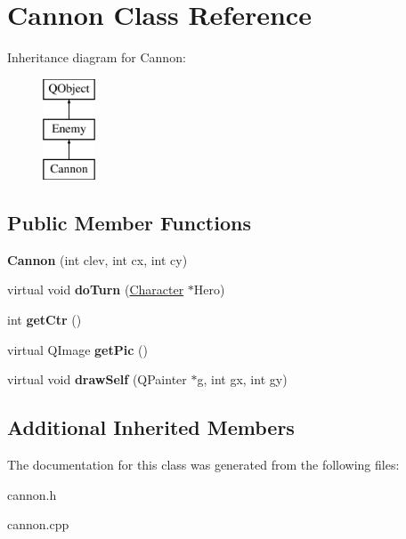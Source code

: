 \hypertarget{class_cannon}{\section{Cannon Class Reference}
\label{class_cannon}
}
Inheritance diagram for Cannon\-:\begin{figure}[H]
\begin{center}
\leavevmode
\includegraphics[height=3.000000cm]{class_cannon}
\end{center}
\end{figure}
\subsection*{Public Member Functions}
\begin{DoxyCompactItemize}
\item 
\hypertarget{class_cannon_a167a36b440912282d8c0b44c93afd20d}{{\bfseries Cannon} (int clev, int cx, int cy)}\label{class_cannon_a167a36b440912282d8c0b44c93afd20d}

\item 
\hypertarget{class_cannon_a0ac51832424376a120add27a8b8f2759}{virtual void {\bfseries do\-Turn} (\hyperlink{class_character}{Character} $\ast$Hero)}\label{class_cannon_a0ac51832424376a120add27a8b8f2759}

\item 
\hypertarget{class_cannon_a38f8c0c7f785ee10df1d83c8274ce546}{int {\bfseries get\-Ctr} ()}\label{class_cannon_a38f8c0c7f785ee10df1d83c8274ce546}

\item 
\hypertarget{class_cannon_acd2aee39d3e6b40681c69d44626ce6dd}{virtual Q\-Image {\bfseries get\-Pic} ()}\label{class_cannon_acd2aee39d3e6b40681c69d44626ce6dd}

\item 
\hypertarget{class_cannon_ab3893b885bdc31461a6cacb072b223a3}{virtual void {\bfseries draw\-Self} (Q\-Painter $\ast$g, int gx, int gy)}\label{class_cannon_ab3893b885bdc31461a6cacb072b223a3}

\end{DoxyCompactItemize}
\subsection*{Additional Inherited Members}


The documentation for this class was generated from the following files\-:\begin{DoxyCompactItemize}
\item 
cannon.\-h\item 
cannon.\-cpp\end{DoxyCompactItemize}
